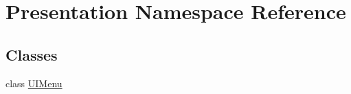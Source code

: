 \hypertarget{namespace_presentation}{}\section{Presentation Namespace Reference}
\label{namespace_presentation}
\subsection*{Classes}
\begin{DoxyCompactItemize}
\item 
class \hyperlink{class_presentation_1_1_u_i_menu}{U\+I\+Menu}
\end{DoxyCompactItemize}
